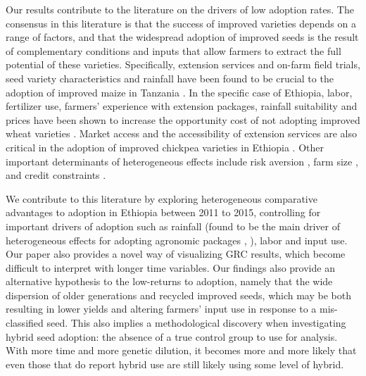 \documentclass[11pt]{article}
\begin{document}
Our results contribute to the literature on the drivers of low adoption rates. The consensus in this literature is that the success of improved varieties depends on a range of factors, and that the widespread adoption of  improved seeds is the result of complementary conditions and inputs that allow farmers to extract the full potential of these varieties. Specifically, extension services and on-farm field trials, seed variety characteristics and rainfall have been found to be crucial to the adoption of improved maize in Tanzania \citep{Kaliba2000-jh}. In the specific case of Ethiopia, labor, fertilizer use, farmers’ experience with extension packages, rainfall suitability and prices have been shown to increase the opportunity cost of not adopting improved wheat varieties \citep{Wale2006-bv}. Market access and the accessibility of extension services are also critical in the adoption of improved chickpea varieties in Ethiopia \citep{Verkaart2019-ol}. Other important determinants of heterogeneous effects include risk aversion \citep{Holden2016-vy}, farm size \citep{Ghimire2015-bd}, and credit constraints \citep{Simtowe2008-jn,Balana2020-hx}. 



We contribute to this literature by exploring heterogeneous comparative advantages to adoption in Ethiopia between 2011 to 2015, controlling for important drivers of adoption such as rainfall (found to be the main driver of heterogeneous effects for adopting agronomic packages \citealt{Marenya2020-kb}, \citealt{Katengeza2019-af}), labor and input use. Our paper also provides a novel way of visualizing GRC results, which become difficult to interpret with longer time variables. Our findings also provide an alternative hypothesis to the low-returns to adoption, namely that the wide dispersion of older generations and recycled improved seeds, which may be both resulting in lower yields and altering farmers' input use in response to a mis-classified seed. This also implies a methodological discovery when investigating hybrid seed adoption: the absence of a true control group to use for analysis. With more time and more genetic dilution, it becomes more and more likely that even those that do report hybrid use are still likely using some level of hybrid.
\end{document}
